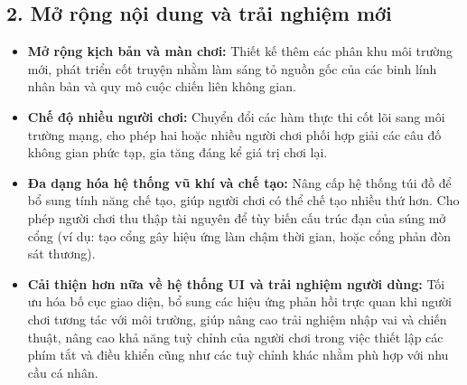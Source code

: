 \documentclass[../DoAn.tex]{subfiles}
\begin{document}
\subsection*{2. Mở rộng nội dung và trải nghiệm mới}
\begin{itemize}
    \item \textbf{Mở rộng kịch bản và màn chơi:} Thiết kế thêm các phân khu môi trường mới, phát triển cốt truyện nhằm làm sáng tỏ nguồn gốc của các binh lính nhân bản và quy mô cuộc chiến liên không gian.
    \item \textbf{Chế độ nhiều người chơi:} Chuyển đổi các hàm thực thi cốt lõi sang môi trường mạng, cho phép hai hoặc nhiều người chơi phối hợp giải các câu đố không gian phức tạp, gia tăng đáng kể giá trị chơi lại.
    \item \textbf{Đa dạng hóa hệ thống vũ khí và chế tạo:} Nâng cấp hệ thống túi đồ để bổ sung tính năng chế tạo, giúp người chơi có thể chế tạo nhiều thứ hơn. Cho phép người chơi thu thập tài nguyên để tùy biến cấu trúc đạn của súng mở cổng (ví dụ: tạo cổng gây hiệu ứng làm chậm thời gian, hoặc cổng phản đòn sát thương).
    \item \textbf{Cải thiện hơn nữa về hệ thống UI và trải nghiệm người dùng:} Tối ưu hóa bố cục giao diện, bổ sung các hiệu ứng phản hồi trực quan khi người chơi tương tác với môi trường, giúp nâng cao trải nghiệm nhập vai và chiến thuật, nâng cao khả năng tuỳ chỉnh của người chơi trong việc thiết lập các phím tắt và điều khiển cũng như các tuỳ chỉnh khác nhằm phù hợp với nhu cầu cá nhân.
\end{itemize}
\end{document}
